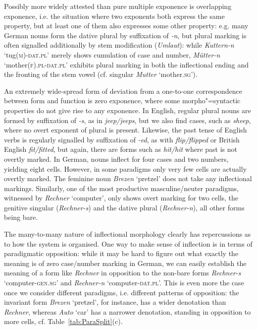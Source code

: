 \documentclass[output=paper
	        ,collection
	        ,collectionchapter
 	        ,biblatex
                ,babelshorthands
                ,newtxmath
                ,draftmode
                ,colorlinks, citecolor=brown
]{langscibook}
\begin{document}
Possibly more widely attested than pure multiple exponence is
overlapping exponence, i.e. the situation where two exponents both
express the same property, but at least one of them also expresses
some other property: e.g. many German nouns form the dative plural by
suffixation of \textit{-n}, but plural marking is often signalled
additionally by stem modification (\textit{Umlaut}): while
\textit{Kuttern-n} `tug(\textsc{m})-\textsc{dat.pl}' merely shows
cumulation of case and number, \textit{Mütter-n}
`mother(\textsc{f}).\textsc{pl}-\textsc{dat.pl}' exhibits plural
marking in both the inflectional ending and the fronting of the stem
vowel (cf. singular \textit{Mutter} `mother.\textsc{sg}').

An extremely wide-spread form of deviation from a one-to-one
correspondence between form and function is zero exponence, where some
morpho"=syntactic properties do not give rise to any exponence. In
English, regular plural nouns are formed by suffixation of
\textit{-s}, as in \textit{jeep/jeeps}, but we also find cases, such
as \textit{sheep}, where no overt exponent of plural is
present. Likewise, the past tense of English verbs is regularly
signalled by suffixation of \textit{-ed}, as with
\textit{flip/flipped} or British English \textit{fit/fitted}, but
again, there are forms such as \textit{hit/hit} where past is not
overtly marked.  In German, nouns inflect for four cases and two
numbers, yielding eight cells. However, in some paradigms
 only very
few cells are actually overtly marked. The feminine noun
\textit{Brezen} `pretzel' does not take any inflectional
markings. Similarly, one of the most productive masculine/neuter
paradigms, witnessed by \textit{Rechner} `computer', only shows overt
marking for two cells, the genitive singular (\textit{Rechner-s}) and
the dative plural (\textit{Rechner-n}), all other forms being bare.



The many-to-many nature of inflectional morphology clearly has
repercussions as to how the system is organised.  One way to make
sense of inflection is in terms of paradigmatic opposition: while it
may be hard to figure out what exactly the meaning is of zero
case/number marking in German, we can easily establish the meaning of
a form like \textit{Rechner} in opposition to the non-bare forms
\textit{Rechner-s} `computer-\textsc{gen.sg}' and \textit{Rechner-n}
`computer-\textsc{dat.pl}'. This is even more the case once we
consider different paradigms, i.e. different patterns of opposition:
the invariant form \textit{Brezen} `pretzel', for instance, has a wider
denotation than \textit{Rechner}, whereas \textit{Auto}
`car' has a narrower denotation,  standing in
opposition to more cells, cf. Table~\ref{tab:ParaSplit}(c).    
\end{document}
